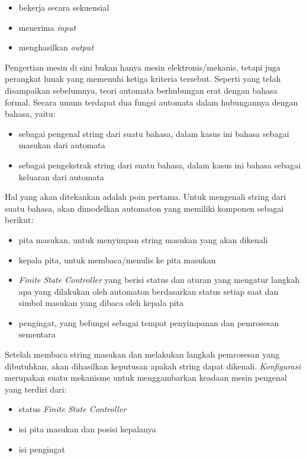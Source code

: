 \begin{itemize}
	\item bekerja secara sekuensial
	\item menerima \textit{input}
	\item menghasilkan \textit{output}
\end{itemize}

Pengertian mesin di sini bukan hanya mesin elektronis/mekanis, tetapi juga perangkat lunak yang memenuhi ketiga kriteria tersebut. Seperti yang telah disampaikan sebelumnya, teori automata berhubungan erat dengan bahasa formal. Secara umum terdapat dua fungsi automata dalam hubungannya dengan bahasa, yaitu:

\begin{itemize}
	\item sebagai pengenal string dari suatu bahasa, dalam kasus ini bahasa sebagai masukan dari automata
	\item sebagai pengekstrak string dari suatu bahasa, dalam kasus ini bahasa sebagai keluaran dari automata
\end{itemize}

Hal yang akan ditekankan adalah poin pertama. Untuk mengenali string dari suatu bahasa, akan dimodelkan automaton yang memiliki komponen sebagai berikut:

\begin{itemize}
	\item pita masukan, untuk menyimpan string masukan yang akan dikenali
	\item kepala pita, untuk membaca/menulis ke pita masukan 
	\item \textit{Finite State Controller} yang berisi status dan aturan yang mengatur langkah apa yang dilakukan oleh automaton berdasarkan status setiap saat dan simbol masukan yang dibaca oleh kepala pita
	\item pengingat, yang befungsi sebagai tempat penyimpanan dan pemrosesan sementara
\end{itemize}

Setelah membaca string masukan dan melakukan langkah pemrosesan yang dibutuhkan, akan dihasilkan keputusan apakah string dapat dikenali. \textit{Konfigurasi} merupakan suatu mekanisme untuk menggambarkan keadaan mesin pengenal yang terdiri dari:

\begin{itemize}
	\item status \textit{Finite State Controller}
	\item isi pita masukan dan posisi kepalanya
	\item isi pengingat
\end{itemize}

